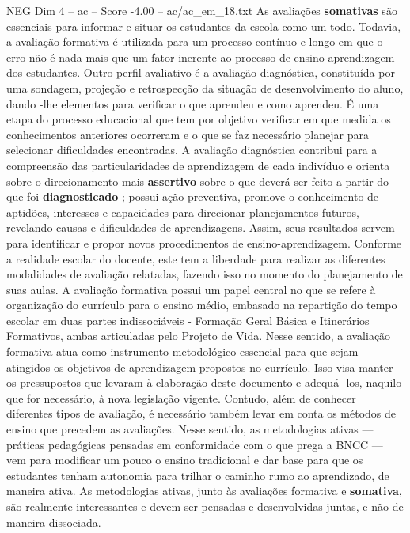 \begin{textsample}{NEG Dim 4 – ac – Score -4.00 – ac/ac\_em\_18.txt}
As avaliações \textbf{somativas} são essenciais para informar e situar os estudantes da escola como um todo.
Todavia, a avaliação formativa é utilizada para um processo contínuo e longo em que o erro não é nada mais que um fator inerente ao processo de ensino-aprendizagem dos estudantes.
Outro perfil avaliativo é a avaliação diagnóstica, constituída por uma sondagem, projeção e retrospecção da situação de desenvolvimento do aluno, dando -lhe elementos para verificar o que aprendeu e como aprendeu.
É uma etapa do processo educacional que tem por objetivo verificar em que medida os conhecimentos anteriores ocorreram e o que se faz necessário planejar para selecionar dificuldades encontradas.
A avaliação diagnóstica contribui para a compreensão das particularidades de aprendizagem de cada indivíduo e orienta sobre o direcionamento mais \textbf{assertivo} sobre o que deverá ser feito a partir do que foi \textbf{diagnosticado} ; possui ação preventiva, promove o conhecimento de aptidões, interesses e capacidades para direcionar planejamentos futuros, revelando causas e dificuldades de aprendizagens.
Assim, seus resultados servem para identificar e propor novos procedimentos de ensino-aprendizagem.
Conforme a realidade escolar do docente, este tem a liberdade para realizar as diferentes modalidades de avaliação relatadas, fazendo isso no momento do planejamento de suas aulas.
A avaliação formativa possui um papel central no que se refere à organização do currículo para o ensino médio, embasado na repartição do tempo escolar em duas partes indissociáveis - Formação Geral Básica e Itinerários Formativos, ambas articuladas pelo Projeto de Vida.
Nesse sentido, a avaliação formativa atua como instrumento metodológico essencial para que sejam atingidos os objetivos de aprendizagem propostos no currículo.
Isso visa manter os pressupostos que levaram à elaboração deste documento e adequá -los, naquilo que for necessário, à nova legislação vigente.
Contudo, além de conhecer diferentes tipos de avaliação, é necessário também levar em conta os métodos de ensino que precedem as avaliações.
Nesse sentido, as metodologias ativas — práticas pedagógicas pensadas em conformidade com o que prega a BNCC — vem para modificar um pouco o ensino tradicional e dar base para que os estudantes tenham autonomia para trilhar o caminho rumo ao aprendizado, de maneira ativa.
As metodologias ativas, junto às avaliações formativa e \textbf{somativa}, são realmente interessantes e devem ser pensadas e desenvolvidas juntas, e não de maneira dissociada.

\end{textsample}
